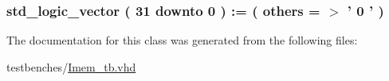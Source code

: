 \hypertarget{class_imem__tb_1_1behavior_a910b9e51355861e290a75682f69dbdb9}{
\subsubsection[{pc}]{ {\bfseries std\-\_\-logic\-\_\-vector (   31    downto    0  )  \-:= (  others  = $>$ '  0  '  ) } }}\label{class_imem__tb_1_1behavior_a910b9e51355861e290a75682f69dbdb9}


\-The documentation for this class was generated from the following files\-:\begin{DoxyCompactItemize}
\item 
testbenches/\hyperlink{_imem__tb_8vhd}{\-Imem\-\_\-tb.\-vhd}\end{DoxyCompactItemize}
